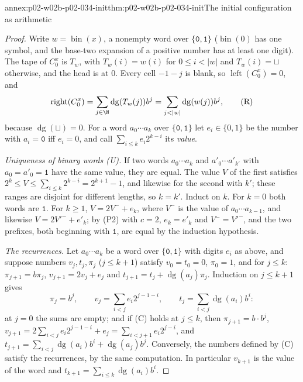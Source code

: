 \begin{annexitem}{annex:p02-w02b-p02-034-init}{thm:p02-w02b-p02-034-init}{The initial configuration as arithmetic}
\begin{proof}
Write \(w=\operatorname{bin}(x)\), a nonempty word over
\(\{\mathtt 0,\mathtt 1\}\) (\(\operatorname{bin}(0)\) has one symbol, and
the base-two expansion of a positive number has at least one digit).  The
tape of \(C^x_0\) is \(T_w\), with \(T_w(i)=w(i)\) for \(0\le i<|w|\) and
\(T_w(i)=\sqcup\) otherwise, and the head is at \(0\).  Every cell \(-1-j\)
is blank, so \(\operatorname{left}(C^x_0)=0\), and
\[
 \operatorname{right}(C^x_0)=\sum_{j\in\N}\operatorname{dg}(T_w(j))b^j
 =\sum_{j<|w|}\operatorname{dg}(w(j))b^j,
 \tag{R}
\]
because \(\operatorname{dg}(\sqcup)=0\).  For a word
\(a_0\cdots a_k\) over \(\{\mathtt 0,\mathtt 1\}\) let \(e_i\in\{0,1\}\) be the
number with \(a_i=\mathtt 0\) iff \(e_i=0\), and call
\(\sum_{i\le k}e_i2^{k-i}\) its \emph{value}.

\emph{Uniqueness of binary words (U).}  If two words \(a_0\cdots a_k\) and
\(a'_0\cdots a'_{k'}\) with \(a_0=a'_0=\mathtt 1\) have the same value, they
are equal.  The value \(V\) of the first satisfies
\(2^k\le V\le\sum_{i\le k}2^{k-i}=2^{k+1}-1\), and likewise for the second
with \(k'\); these ranges are disjoint for different lengths, so \(k=k'\).
Induct on \(k\).  For \(k=0\) both words are \(\mathtt 1\).  For \(k\geq1\),
\(V=2V^-+e_k\), where \(V^-\) is the value of \(a_0\cdots a_{k-1}\), and
likewise \(V=2V'^-+e'_k\); by (P2) with \(c=2\), \(e_k=e'_k\) and
\(V^-=V'^-\), and the two prefixes, both beginning with \(\mathtt 1\), are
equal by the induction hypothesis.

\emph{The recurrences.}  Let \(a_0\cdots a_k\) be a word over
\(\{\mathtt 0,\mathtt 1\}\) with digits \(e_i\) as above, and suppose numbers
\(v_j,t_j,\pi_j\) (\(j\le k+1\)) satisfy \(v_0=t_0=0\), \(\pi_0=1\), and for
\(j\le k\): \(\pi_{j+1}=b\pi_j\), \(v_{j+1}=2v_j+e_j\) and
\(t_{j+1}=t_j+\operatorname{dg}(a_j)\pi_j\).  Induction on \(j\le k+1\) gives
\[
 \pi_j=b^j,\qquad v_j=\sum_{i<j}e_i2^{j-1-i},\qquad
 t_j=\sum_{i<j}\operatorname{dg}(a_i)b^i:
 \tag{C}
\]
at \(j=0\) the sums are empty; and if (C) holds at \(j\le k\), then
\(\pi_{j+1}=b\cdot b^j\),
\(v_{j+1}=2\sum_{i<j}e_i2^{j-1-i}+e_j=\sum_{i<j+1}e_i2^{j-i}\), and
\(t_{j+1}=\sum_{i<j}\operatorname{dg}(a_i)b^i+\operatorname{dg}(a_j)b^j\).
Conversely, the numbers defined by (C) satisfy the recurrences, by the same
computation.  In particular \(v_{k+1}\) is the value of the word and
\(t_{k+1}=\sum_{i\le k}\operatorname{dg}(a_i)b^i\).


\end{proof}
\end{annexitem}
